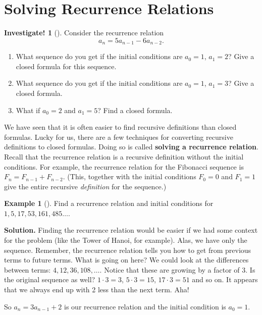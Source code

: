 \documentclass[10pt,]{book}
\newcommand{\terminology}[1]{\textbf{#1}}
\theoremstyle{plain}
\theoremstyle{definition}
\theoremstyle{definition}
\newtheorem{example}[theorem]{Example}
\theoremstyle{definition}
\newtheorem{investigation}[project]{Investigate!}
\theoremstyle{definition}
\numberwithin{equation}{chapter}
\begin{document}
\section[{Solving Recurrence Relations}]{Solving Recurrence Relations}\label{sec_recurrence}
\begin{investigation}[]\label{investigation-7}
\hypertarget{p-287}{}%
Consider the recurrence relation%
\begin{equation*}
a_n = 5a_{n-1} - 6a_{n-2}.
\end{equation*}
%
\begin{enumerate}
\item\hypertarget{li-181}{}\hypertarget{p-288}{}%
What sequence do you get if the initial conditions are \(a_0 = 1\), \(a_1 = 2\)? Give a closed formula for this sequence.%
\item\hypertarget{li-182}{}\hypertarget{p-289}{}%
What sequence do you get if the initial conditions are \(a_0 = 1\), \(a_1 = 3\)? Give a closed formula.%
\item\hypertarget{li-183}{}\hypertarget{p-290}{}%
What if \(a_0 = 2\) and \(a_1 = 5\)? Find a closed formula.%
\end{enumerate}
%
\end{investigation}
\hypertarget{p-291}{}%
We have seen that it is often easier to find recursive definitions than closed formulas. Lucky for us, there are a few techniques for converting recursive definitions to closed formulas. Doing so is called \terminology{solving a recurrence relation}. Recall that the recurrence relation is a recursive definition without the initial conditions. For example, the recurrence relation for the Fibonacci sequence is \(F_n = F_{n-1} + F_{n-2}\). (This, together with the initial conditions \(F_0 = 0\) and \(F_1 = 1\) give the entire recursive \emph{definition} for the sequence.)%
\begin{example}[]\label{example-18}
\hypertarget{p-292}{}%
Find a recurrence relation and initial conditions for \(1, 5, 17, 53, 161, 485\ldots\).%
\par\smallskip%
\noindent\textbf{Solution.}\hypertarget{solution-32}{}\quad%
\hypertarget{p-293}{}%
Finding the recurrence relation would be easier if we had some context for the problem (like the Tower of Hanoi, for example). Alas, we have only the sequence. Remember, the recurrence relation tells you how to get from previous terms to future terms. What is going on here? We could look at the differences between terms: \(4, 12, 36, 108, \ldots\). Notice that these are growing by a factor of 3. Is the original sequence as well? \(1\cdot 3 = 3\), \(5 \cdot 3 = 15\), \(17 \cdot 3 = 51\) and so on. It appears that we always end up with 2 less than the next term. Aha!%
\par
\hypertarget{p-294}{}%
So \(a_n = 3a_{n-1} + 2\) is our recurrence relation and the initial condition is \(a_0 = 1\).%
\end{example}
\end{document}
